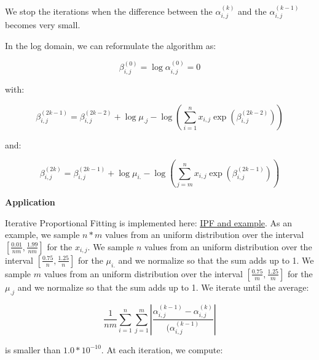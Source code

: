 We stop the iterations when the difference between the $\alpha_{i,j}^{\left(k\right)}$ and the $\alpha_{i,j}^{\left(k - 1\right)}$ becomes very small.

In the log domain, we can reformulate the algorithm as:

\begin{equation*}
\beta_{i,j}^{\left(0\right)} = \log \alpha_{i,j}^{\left(0\right)} = 0
\end{equation*}

with:

\begin{equation*}
\beta_{i,j}^{\left(2 k - 1\right)} = \beta_{i,j}^{\left(2 k - 2\right)} + \log \mu_{.j} - \log \left( \sum_{i = 1}^n x_{i,j} \exp \left( \beta_{i,j}^{\left(2 k - 2\right)} \right) \right)
\end{equation*}

and:

\begin{equation*}
\beta_{i,j}^{\left(2 k\right)} = \beta_{i,j}^{\left(2 k - 1\right)} + \log \mu_{i.} - \log \left( \sum_{j = m}^n x_{i,j} \exp \left( \beta_{i,j}^{\left(2 k - 1\right)} \right) \right)
\end{equation*}

\vspace{1em}

\textbf{Application}

\vspace{1em}

Iterative Proportional Fitting is implemented here: \href{https://github.com/ADucellierIHME/raking_IPF}{IPF and example}. As an example, we sample $n * m$ values from an uniform distribution over the interval $\left[ \frac{0.01}{n m}, \frac{1.99}{n m} \right]$ for the $x_{i,j}$. We sample $n$ values from an uniform distribution over the interval $\left[ \frac{0.75}{n} , \frac{1.25}{n} \right]$ for the $\mu_{i.}$ and we normalize so that the sum adds up to 1. We sample $m$ values from an uniform distribution over the interval $\left[ \frac{0.75}{m}, \frac{1.25}{m} \right]$ for the $\mu_{.j}$ and we normalize so that the sum adds up to 1. We iterate until the average:

\begin{equation*}
\frac{1}{n m} \sum_{i = 1}^n \sum_{j = 1}^m \left\vert \frac{\alpha_{i,j}^{\left( k - 1 \right)} - \alpha_{i,j}^{\left( k \right)}}{(\alpha_{i,j}^{\left( k - 1 \right)}} \right\vert
\end{equation*}

is smaller than $1.0 * 10^{-10}$. At each iteration, we compute:

